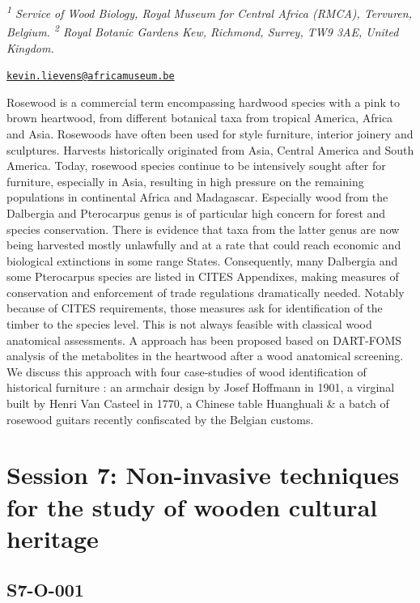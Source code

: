 \documentclass[
]{book}
\begin{document}
\emph{\textsuperscript{1} Service of Wood Biology, Royal Museum for Central Africa (RMCA), Tervuren, Belgium. \textsuperscript{2} Royal Botanic Gardens Kew, Richmond, Surrey, TW9 3AE, United Kingdom.}

\href{mailto:kevin.lievens@africamuseum.be}{\nolinkurl{kevin.lievens@africamuseum.be}}

Rosewood is a commercial term encompassing hardwood species with a pink to brown heartwood, from different botanical taxa from tropical America, Africa and Asia. Rosewoods have often been used for style furniture, interior joinery and sculptures. Harvests historically originated from Asia, Central America and South America. Today, rosewood species continue to be intensively sought after for furniture, especially in Asia, resulting in high pressure on the remaining populations in continental Africa and Madagascar. Especially wood from the Dalbergia and Pterocarpus genus is of particular high concern for forest and species conservation. There is evidence that taxa from the latter genus are now being harvested mostly unlawfully and at a rate that could reach economic and biological extinctions in some range States. Consequently, many Dalbergia and some Pterocarpus species are listed in CITES Appendixes, making measures of conservation and enforcement of trade regulations dramatically needed. Notably because of CITES requirements, those measures ask for identification of the timber to the species level. This is not always feasible with classical wood anatomical assessments. A approach has been proposed based on DART-FOMS analysis of the metabolites in the heartwood after a wood anatomical screening. We discuss this approach with four case-studies of wood identification of historical furniture : an armchair design by Josef Hoffmann in 1901, a virginal built by Henri Van Casteel in 1770, a Chinese table Huanghuali \& a batch of rosewood guitars recently confiscated by the Belgian customs.

\hypertarget{session-7-non-invasive-techniques-for-the-study-of-wooden-cultural-heritage}{%
\chapter*{Session 7: Non-invasive techniques for the study of wooden cultural heritage}\label{session-7-non-invasive-techniques-for-the-study-of-wooden-cultural-heritage}}

\hypertarget{s7-o-001}{%
\section*{S7-O-001}\label{s7-o-001}}
\end{document}
